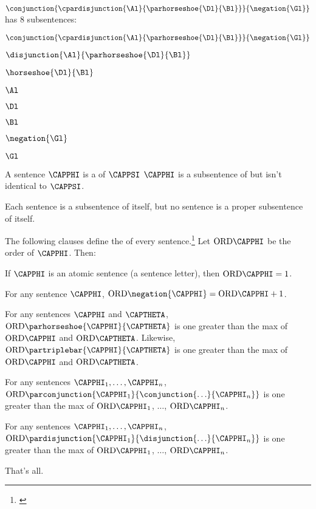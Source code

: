 \begin{majorILnc}{}
$\conjunction{\cpardisjunction{\Al}{\parhorseshoe{\Dl}{\Bl}}}{\negation{\Gl}}$ has 8 subsentences:
\begin{multicols}{2}
\begin{cenumerate}
\item $\conjunction{\cpardisjunction{\Al}{\parhorseshoe{\Dl}{\Bl}}}{\negation{\Gl}}$
\item $\disjunction{\Al}{\parhorseshoe{\Dl}{\Bl}}$
\item $\horseshoe{\Dl}{\Bl}$
\item $\Al$
\item $\Dl$
\item $\Bl$
\item $\negation{\Gl}$
\item $\Gl$
\end{cenumerate}
\end{multicols}
\end{majorILnc}
\begin{majorILnc}{}
	A sentence $\CAPPHI$ is a  of $\CAPPSI$ \Iff $\CAPPHI$ is a subsentence of but isn't identical to $\CAPPSI$.
\end{majorILnc}
\noindent{}Each sentence is a subsentence of itself, but no sentence is a proper subsentence of itself.
\begin{majorILnc}{}
The following clauses define the  of every \GSL{} sentence.\footnote{\citetext{\citealt{Post1921}, \citealt[11]{Hodges2001}}} Let $\ORD{\CAPPHI}$ be the order of $\CAPPHI$. Then: 
\begin{cenumerate}
\item If $\CAPPHI$ is an atomic sentence (a sentence letter), then $\ORD{\CAPPHI}=1$.
\item For any sentence $\CAPPHI$, $\ORD{\negation{\CAPPHI}}=\ORD{\CAPPHI}+1$.
\item For any sentences $\CAPPHI$ and $\CAPTHETA$, $\ORD{\parhorseshoe{\CAPPHI}{\CAPTHETA}}$ is one greater than the max of $\ORD{\CAPPHI}$ and $\ORD{\CAPTHETA}$. Likewise, $\ORD{\partriplebar{\CAPPHI}{\CAPTHETA}}$ is one greater than the max of $\ORD{\CAPPHI}$ and $\ORD{\CAPTHETA}$.
\item For any sentences $\CAPPHI_1,\ldots,\CAPPHI_\integer{n}$, $\ORD{\parconjunction{\CAPPHI_1}{\conjunction{\ldots}{\CAPPHI_\integer{n}}}}$ is one greater than the max of $\ORD{\CAPPHI_1}$, $\ldots$, $\ORD{\CAPPHI_\integer{n}}$.
\item For any sentences $\CAPPHI_1,\ldots,\CAPPHI_\integer{n}$, $\ORD{\pardisjunction{\CAPPHI_1}{\disjunction{\ldots}{\CAPPHI_\integer{n}}}}$ is one greater than the max of $\ORD{\CAPPHI_1}$, $\ldots$, $\ORD{\CAPPHI_\integer{n}}$. 
\item That's all.
\end{cenumerate}
\end{majorILnc}
